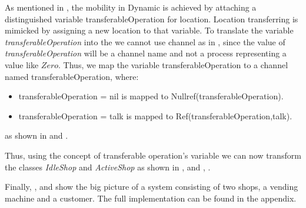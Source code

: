 As mentioned in , the mobility in Dynamic \oz{} is achieved
by attaching a distinguished variable transferableOperation for location. Location transferring
is mimicked by assigning a new location to that variable. To translate the variable \emph{transferableOperation} into the \picalc{} we cannot use \picalc{} channel as in , since the value of \emph{transferableOperation} will be a channel name and not a process representing a value like $Zero$. Thus, we map the variable transferableOperation to a channel named transferableOperation, where:

\begin{itemize}
\item transferableOperation = nil is mapped to Nullref(transferableOperation).

\item transferableOperation = talk is mapped to Ref(transferableOperation,talk).
\end{itemize}
as shown in  and .

Thus, using the concept of transferable operation's variable we can now transform the classes \textit{IdleShop} and \textit{ActiveShop} as shown in ,  and , .



Finally, ,  and  show the big picture of a system consisting of two shops, a vending machine and a customer. The full implementation can be found in the appendix.
